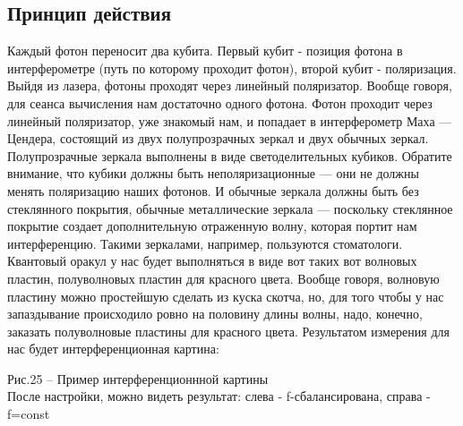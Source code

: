\documentclass[11pt]{report}
\begin{document}
\subsection{Принцип действия}
Каждый фотон переносит два кубита. Первый кубит - позиция фотона в интерферометре (путь по которому проходит фотон), второй кубит - поляризация. Выйдя из лазера, фотоны проходят через линейный поляризатор. Вообще говоря, для сеанса вычисления нам достаточно одного фотона. Фотон проходит через линейный поляризатор, уже знакомый нам, и попадает в интерферометр Маха — Цендера, состоящий из двух полупрозрачных зеркал и двух обычных зеркал. Полупрозрачные зеркала выполнены в виде светоделительных кубиков. Обратите внимание, что кубики должны быть неполяризационные — они не должны менять поляризацию наших фотонов. И обычные зеркала должны быть без стеклянного покрытия, обычные металлические зеркала — поскольку стеклянное покрытие создает дополнительную отраженную волну, которая портит нам интерференцию. Такими зеркалами, например, пользуются стоматологи. Квантовый оракул у нас будет выполняться в виде вот таких вот волновых пластин, полуволновых пластин для красного цвета. Вообще говоря, волновую пластину можно простейшую сделать из куска скотча, но, для того чтобы у нас запаздывание происходило ровно на половину длины волны, надо, конечно, заказать полуволновые пластины для красного цвета. Результатом измерения для нас будет интерференционная картина: \\
\begin{figure}[h]
\end{figure}
Рис.25 -- Пример интерференционнной картины \\

После настройки, можно видеть результат: слева - f-сбалансирована, справа - f=const \\
\end{document}
